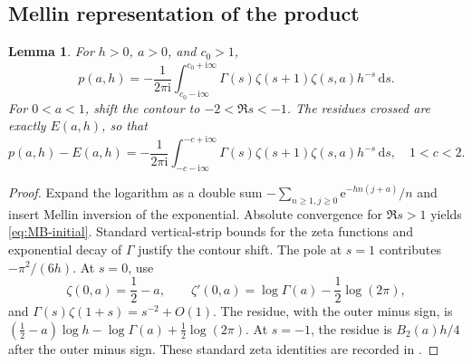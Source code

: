 \documentclass[11pt,a4paper]{article}
\numberwithin{equation}{section}
\newtheorem{lemma}[theorem]{Lemma}
\theoremstyle{definition}
\theoremstyle{remark}\newtheorem{remark}[theorem]{Remark}
\newcommand{\ii}{\mathrm i}\newcommand{\e}{\mathrm e}
\newcommand{\dd}{\,\mathrm d}\newcommand{\id}{\operatorname{id}}
\begin{document}
\subsection{Mellin representation of the product}
\begin{lemma}\label{lem:MB}
For $h>0$, $a>0$, and $c_0>1$,
\begin{equation}\label{eq:MB-initial}
 p(a,h)=-\frac1{2\pi\ii}
 \int_{c_0-\ii\infty}^{c_0+\ii\infty}
       \Gamma(s)\zeta(s+1)\zeta(s,a)h^{-s}\dd s.
\end{equation}
For $0<a<1$, shift the contour to $-2<\Re s<-1$. The residues crossed
are exactly $E(a,h)$, so that
\begin{equation}\label{eq:MB-remainder}
 p(a,h)-E(a,h)=-\frac1{2\pi\ii}
 \int_{-c-\ii\infty}^{-c+\ii\infty}
       \Gamma(s)\zeta(s+1)\zeta(s,a)h^{-s}\dd s,
 \quad1<c<2.
\end{equation}
\end{lemma}
\begin{proof}
Expand the logarithm as a double sum
$-\sum_{n\ge1,j\ge0}\e^{-hn(j+a)}/n$ and insert Mellin inversion of
the exponential. Absolute convergence for $\Re s>1$ yields
\eqref{eq:MB-initial}. Standard vertical-strip bounds for the zeta
functions and exponential decay of $\Gamma$ justify the contour shift.
The pole at $s=1$ contributes $-\pi^2/(6h)$.
At $s=0$, use
\[
 \zeta(0,a)=\frac12-a,\qquad
 \zeta'(0,a)=\log\Gamma(a)-\frac12\log(2\pi),
\]
and $\Gamma(s)\zeta(1+s)=s^{-2}+O(1)$.
The residue, with the outer minus sign, is
$(\frac12-a)\log h-\log\Gamma(a)+\frac12\log(2\pi)$.
At $s=-1$, the residue is $B_2(a)h/4$ after the outer minus sign.
These standard zeta identities are recorded in \cite{dlmfzeta}.
\end{proof}
\end{document}
